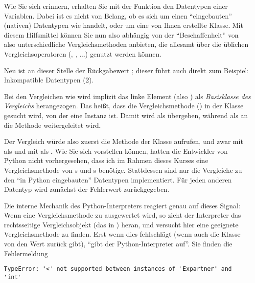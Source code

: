 Wie Sie sich erinnern, erhalten Sie mit der Funktion  den Datentypen einer Variablen. Dabei ist es nicht von Belang, ob es sich um einen \enquote{eingebauten} (nativen) Datentypen wie  handelt, oder um eine von Ihnen erstellte Klasse. Mit diesem Hilfsmittel können Sie nun also abhängig von der \enquote{Beschaffenheit} von  also unterschiedliche Vergleichsmethoden anbieten, die allesamt über die üblichen Vergleichsoperatoren (\inPy{==}, \inPy{<}, ...) genutzt werden können.

Neu ist an dieser Stelle der Rückgabewert ; dieser führt auch direkt zum Beispiel: Inkompatible Datentypen (2).

Bei den Vergleichen wie  wird implizit das linke Element (also ) als \emph{Basisklasse des Vergleichs} herangezogen. Das heißt, dass die Vergleichsmethode () in der Klasse gesucht wird, von der  eine Instanz ist. Damit wird  als  übergeben, während  als  an die Methode weitergeleitet wird.

Der Vergleich  würde also zuerst die Methode  der Klasse  aufrufen, und zwar mit  als  und mit  als . Wie Sie sich vorstellen können, hatten die Entwickler von Python nicht vorhergesehen, dass ich im Rahmen dieses Kurses eine Vergleichsmethode von s und s benötige. Stattdessen sind nur die Vergleiche zu den \enquote{in Python eingebauten} Datentypen implementiert. Für jeden anderen Datentyp wird zunächst der Fehlerwert  zurückgegeben.

Die interne Mechanik des Python-Interpreters reagiert genau auf dieses Signal: Wenn eine Vergleichsmethode zu  ausgewertet wird, so zieht der Interpreter das rechtsseitige Vergleichsobjekt (das  in ) heran, und versucht hier eine geeignete Vergleichsmethode zu finden. Erst wenn dies fehlschlägt (\ie wenn auch die Klasse von  den Wert  zurück gibt), \enquote{gibt der Python-Interpreter auf}. Sie finden die Fehlermeldung
\begin{cmdbox}
\begin{verbatim}
TypeError: '<' not supported between instances of 'Expartner' and 'int'
\end{verbatim}
\end{cmdbox}

